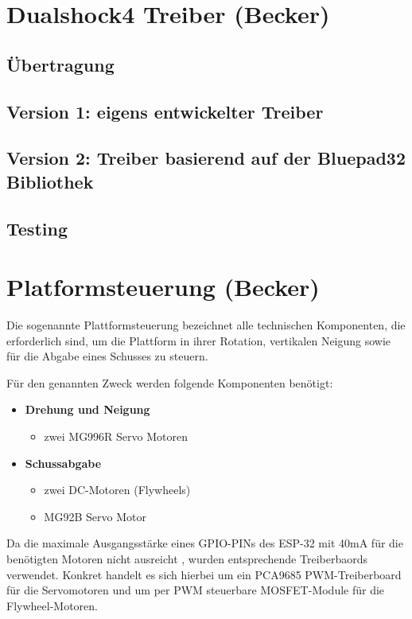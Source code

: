 \section{Dualshock4 Treiber (Becker)}

\subsection{Übertragung}

\subsection{Version 1: eigens entwickelter Treiber}

\subsection{Version 2: Treiber basierend auf der Bluepad32 Bibliothek}

\subsection{Testing}

\section{Platformsteuerung (Becker)}

Die sogenannte Plattformsteuerung bezeichnet alle technischen Komponenten, die erforderlich sind, um die Plattform in ihrer Rotation, vertikalen Neigung sowie für die Abgabe eines Schusses zu steuern.

Für den genannten Zweck werden folgende Komponenten benötigt:

\begin{itemize}
    \item \textbf{Drehung und Neigung}
    \begin{itemize}
        \item zwei MG996R Servo Motoren
    \end{itemize}
    \item \textbf{Schussabgabe}
    \begin{itemize}
        \item zwei DC-Motoren (Flywheels)
        \item MG92B Servo Motor
    \end{itemize}
\end{itemize}

Da die maximale Ausgangsstärke eines GPIO-PINs des ESP-32 mit 40mA \cite[S.~53]{esp_datasheet} für die benötigten Motoren nicht ausreicht \cite{esp_platform_flywheel_motor,esp_platform_small_servo,esp_platform_servo}, wurden entsprechende Treiberbaords verwendet.
Konkret handelt es sich hierbei um ein PCA9685 PWM-Treiberboard für die Servomotoren und um per PWM steuerbare MOSFET-Module für die Flywheel-Motoren.

